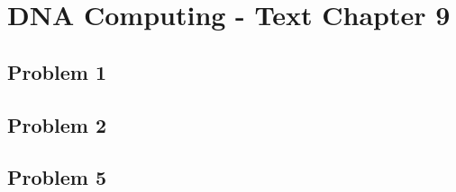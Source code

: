 
\chapter{DNA Computing - Text Chapter 9}


\section{ Problem 1 }

\section{ Problem 2 }

\section{ Problem 5 }